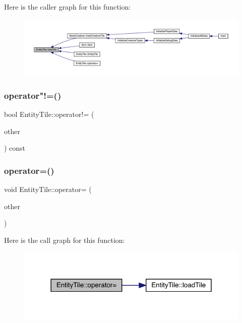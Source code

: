 Here is the caller graph for this function\+:
\nopagebreak
\begin{figure}[H]
\begin{center}
\leavevmode
\includegraphics[width=350pt]{d7/dd4/class_entity_tile_a1a6b6b995ad942e7850f14cc6e693bbc_icgraph}
\end{center}
\end{figure}
\mbox{\label{class_entity_tile_ad5adfda10fac26073effad1f16d6ffb6}} 
\subsubsection{\texorpdfstring{operator"!=()}{operator!=()}}
{\footnotesize\ttfamily bool Entity\+Tile\+::operator!= (\begin{DoxyParamCaption}\item[{const \mbox{\hyperlink{class_entity_tile}{Entity\+Tile}} \&}]{other }\end{DoxyParamCaption}) const}

\mbox{\label{class_entity_tile_a81dbf6b294b80d6edcc830a243cdfae8}} 
\subsubsection{\texorpdfstring{operator=()}{operator=()}}
{\footnotesize\ttfamily void Entity\+Tile\+::operator= (\begin{DoxyParamCaption}\item[{const \mbox{\hyperlink{class_entity_tile}{Entity\+Tile}} \&}]{other }\end{DoxyParamCaption})}

Here is the call graph for this function\+:
\nopagebreak
\begin{figure}[H]
\begin{center}
\leavevmode
\includegraphics[width=318pt]{d7/dd4/class_entity_tile_a81dbf6b294b80d6edcc830a243cdfae8_cgraph}
\end{center}
\end{figure}
\mbox{\label{class_entity_tile_a2b8c81d35530991c08ca2b6a76e436bf}} 
